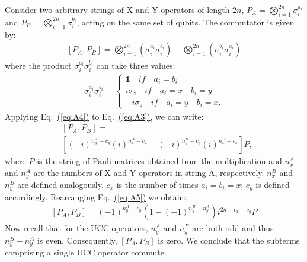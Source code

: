 \documentclass[superscriptaddress,aps,pra,twocolumn,nofootinbib,babel]{revtex4-1}
\newcommand{\eq}[1]{Eq.~\hyperref[eq:#1]{(\ref*{eq:#1})}}
\begin{document}
Consider two arbitrary strings of X and Y operators of length $2n$, $P_A=\bigotimes^{2n}_{i=1}\sigma^{a_{i}}_{i}$ and $P_B=\bigotimes^{2n}_{i=1}\sigma^{b_{i}}_{i}$, acting on the same set of qubits. The commutator is given by:
\begin{align}\label{eq:A3}
[P_A,P_B]=\bigotimes^{2n}_{i=1} (\sigma^{a_{i}}_{i} \sigma^{b_{i}}_{i}) - \bigotimes^{2n}_{i=1}(\sigma^{b_{i}}_{i} \sigma^{a_{i}}_{i})
\end{align}
where the product $\sigma^{a_{i}}_{i} \sigma^{b_{i}}_{i}$ can take three values:
\begin{align}\label{eq:A4}
\sigma^{a_{i}}_{i} \sigma^{b_{i}}_{i}=
\left\{
	\begin{array}{ll}
    \bm{1} \quad if \quad a_{i} = b_{i}\\
    i\sigma_z \quad if \quad a_{i} = x \quad b_{i}=y\\
    -i\sigma_z \quad if \quad a_{i} = y \quad b_{i}=x.
	\end{array}
\right.
\end{align}
Applying \eq{A4} to \eq{A3}, we can write:
\begin{align}
&[P_A,P_B]=\nonumber\\ &\left[(-i)^{n^A_y-c_y}(i)^{n^A_x-c_x} - (-i)^{n^B_y-c_y}(i)^{n^B_x-c_x}\right]P,\label{eq:A5}
\end{align}
where $P$ is the string of Pauli matrices obtained from the multiplication and $n^A_x$ and $n^A_y$ are the numbers of X and Y operators in string A, respectively.  $n^B_x$ and  $n^B_y$ are defined analogously. $c_x$ is the number of times $a_i=b_i=x$; $c_y$ is defined accordingly. Rearranging \eq{A5} we obtain:
\begin{align}\label{eq:A6}
[P_A,P_B]= (-1)^{n^A_y-c_y}\left(1-(-1)^{n^B_y-n^A_y}\right)i^{2n-c_x-c_y}P
\end{align}
Now recall that for the UCC operators, $n^A_y$ and $n^B_y$ are both odd and thus $n^B_y-n^A_y$ is even. Consequently, $[P_A,P_B]$ is zero. We conclude that the subterms comprising a single UCC operator commute.

\newpage



\end{document}
